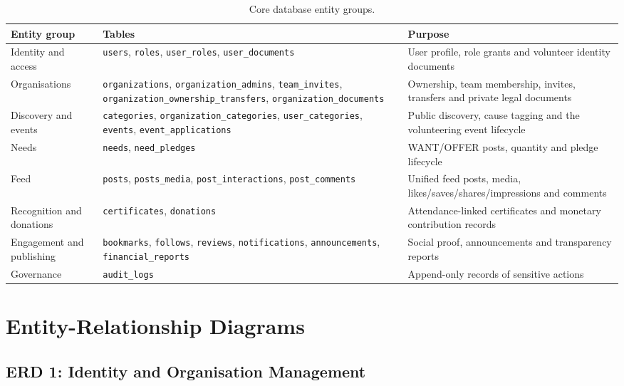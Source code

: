 \begin{table}[H]\centering
\caption{Core database entity groups.}
\label{tab:entities}
\begin{tabularx}{\textwidth}{|p{}|p{}|Y|}
\hline
\textbf{Entity group} & \textbf{Tables} & \textbf{Purpose}\\\hline
Identity and access & \texttt{users}, \texttt{roles}, \texttt{user\_roles}, \texttt{user\_documents} & User profile, role grants and volunteer identity documents\\\hline
Organisations & \texttt{organizations}, \texttt{organization\_admins}, \texttt{team\_invites}, \texttt{organization\_ownership\_transfers}, \texttt{organization\_documents} & Ownership, team membership, invites, transfers and private legal documents\\\hline
Discovery and events & \texttt{categories}, \texttt{organization\_categories}, \texttt{user\_categories}, \texttt{events}, \texttt{event\_applications} & Public discovery, cause tagging and the volunteering event lifecycle\\\hline
Needs & \texttt{needs}, \texttt{need\_pledges} & WANT/OFFER posts, quantity and pledge lifecycle\\\hline
Feed & \texttt{posts}, \texttt{posts\_media}, \texttt{post\_interactions}, \texttt{post\_comments} & Unified feed posts, media, likes/saves/shares/impressions and comments\\\hline
Recognition and donations & \texttt{certificates}, \texttt{donations} & Attendance-linked certificates and monetary contribution records\\\hline
Engagement and publishing & \texttt{bookmarks}, \texttt{follows}, \texttt{reviews}, \texttt{notifications}, \texttt{announcements}, \texttt{financial\_reports} & Social proof, announcements and transparency reports\\\hline
Governance & \texttt{audit\_logs} & Append-only records of sensitive actions\\\hline
\end{tabularx}
\end{table}

\section{Entity-Relationship Diagrams}
\label{sec:erd}



\subsection{ERD 1: Identity and Organisation Management}


